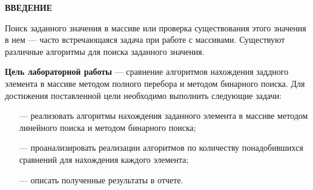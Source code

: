 \begin{center}
    \textbf{ВВЕДЕНИЕ}
\end{center}

Поиск заданного значения в массиве или проверка существования этого значения в нем --- часто встречающаяся задача при работе с массивами. Существуют различные алгоритмы для поиска заданного значения.

\textbf{Цель лабораторной работы} --- сравнение алгоритмов нахождения заддного элемента в массиве методом полного перебора и методом бинарного поиска. Для достижения поставленной цели необходимо выполнить следующие задачи:
\begin{itemize}
    \item[---] реализовать алгоритмы нахождения заданного элемента в массиве методом линейного поиска и методом бинарного поиска;
    \item[---] проанализировать реализации алгоритмов по количеству понадобившихся сравнений для нахождения каждого элемента;
    \item[---] описать полученные результаты в отчете.
\end{itemize}